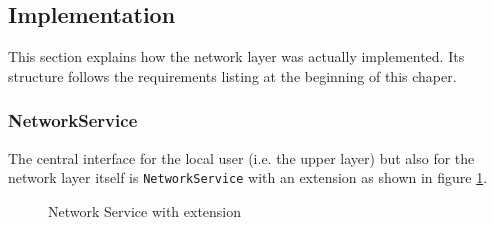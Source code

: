 \subsection{Implementation}
 \label{network.communication.implementation}

This section explains how the network layer was actually implemented. Its structure follows the requirements listing at the beginning of this chaper.

\subsubsection{NetworkService}
The central interface for the local user (i.e. the upper layer) but also for the network layer itself is \texttt{NetworkService} with an extension as shown in figure \ref{fig:network.discovery.networkservice.uml}.

\begin{figure}[H]
 \centering
 \caption{Network Service with extension}
 \label{fig:network.discovery.networkservice.uml}
\end{figure}

